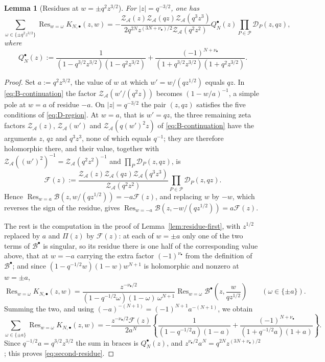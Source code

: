 \documentclass[a4paper,reqno]{amsart}
\numberwithin{equation}{section}
\newtheorem{lemma}[theorem]{Lemma}
\theoremstyle{remark}
\theoremstyle{definition}
\newcommand{\A}{\mathcal{A}}
\begin{document}
\begin{lemma}[Residues at $w=\pm q^2z^{3/2}$]
For $|z|=q^{-3/2}$, one has
\begin{equation}\label{eq:second-residue}
\sum_{\omega\in\{\pm q^2z^{3/2}\}}
\operatorname{Res}_{w=\omega}K_{N,\bullet}(z,w)
=
-\frac{
\mathcal Z_{\A}(z)
\mathcal Z_{\A}(qz)
\mathcal Z_{\A}(q^3z^3)}
{2q^{2N}z^{(3N+\nu_\bullet)/2}\mathcal Z_{\A}(q^2z^2)}
Q_N^{\bullet}(z)
\prod_{P\in\mathcal P}\mathcal D_P(z,qz),
\end{equation}
where
\begin{equation}\label{eq:QN-def}
Q_N^{\bullet}(z)
:=
\frac{1}
{(1-q^{3/2}z^{3/2})(1-q^2z^{3/2})}
+
\frac{(-1)^{N+\nu_\bullet}}
{(1+q^{3/2}z^{3/2})(1+q^2z^{3/2})}.
\end{equation}
\end{lemma}

\begin{proof}
Set $a:=q^2z^{3/2}$, the value of $w$ at which $w'=w/(qz^{1/2})$ equals
$qz$. In \eqref{eq:B-continuation} the factor $\mathcal Z_{\A}(w'/(q^2z))$
becomes $(1-w/a)^{-1}$, a simple pole at $w=a$ of residue $-a$. On
$|z|=q^{-3/2}$ the pair $(z,qz)$ satisfies the five conditions of
\eqref{eq:D-region}. At $w=a$, that is $w'=qz$, the three remaining zeta
factors $\mathcal Z_{\A}(z)$, $\mathcal Z_{\A}(w')$ and
$\mathcal Z_{\A}(q(w')^2z)$ of \eqref{eq:B-continuation} have the arguments
$z$, $qz$ and $q^3z^3$, none of which equals $q^{-1}$; they are therefore
holomorphic there, and their value, together with
$\mathcal Z_{\A}((w')^2)^{-1}=\mathcal Z_{\A}(q^2z^2)^{-1}$ and
$\prod_P\mathcal D_P(z,qz)$, is
$$
\mathscr F(z):=\frac{\mathcal Z_{\A}(z)\mathcal Z_{\A}(qz)
\mathcal Z_{\A}(q^3z^3)}{\mathcal Z_{\A}(q^2z^2)}
\prod_{P\in\mathcal P}\mathcal D_P(z,qz).
$$
Hence $\operatorname{Res}_{w=a}\mathcal B(z,w/(qz^{1/2}))=-a\mathscr F(z)$,
and replacing $w$ by $-w$, which reverses the sign of the residue, gives
$\operatorname{Res}_{w=-a}\mathcal B(z,-w/(qz^{1/2}))=a\mathscr F(z)$.

The rest is the computation in the proof of Lemma~\ref{lem:residue-first},
with $z^{1/2}$ replaced by $a$ and $\Pi(z)$ by $\mathscr F(z)$: at each of
$w=\pm a$ only one of the two terms of $\mathcal B^{\bullet}$ is singular,
so its residue there is one half of the corresponding value above, that at
$w=-a$ carrying the extra factor $(-1)^{\nu_\bullet}$ from the definition of
$\mathcal B^{\bullet}$; and since $(1-q^{-1/2}w)(1-w)w^{N+1}$ is holomorphic
and nonzero at $w=\pm a$,
$$
\operatorname{Res}_{w=\omega}K_{N,\bullet}(z,w)
=
\frac{z^{-\nu_\bullet/2}}
{(1-q^{-1/2}\omega)(1-\omega)\,\omega^{N+1}}
\operatorname{Res}_{w=\omega}
\mathcal B^{\bullet}\!\left(z,\frac{w}{qz^{1/2}}\right)
\qquad(\omega\in\{\pm a\}).
$$
Summing the two, and using $(-a)^{-(N+1)}=(-1)^{N+1}a^{-(N+1)}$, we obtain
$$
\sum_{\omega\in\{\pm a\}}\operatorname{Res}_{w=\omega}K_{N,\bullet}(z,w)
=-\frac{z^{-\nu_\bullet/2}\mathscr F(z)}{2a^N}
\left\{\frac{1}{(1-q^{-1/2}a)(1-a)}
+\frac{(-1)^{N+\nu_\bullet}}{(1+q^{-1/2}a)(1+a)}\right\}.
$$
Since $q^{-1/2}a=q^{3/2}z^{3/2}$ the sum in braces is $Q_N^{\bullet}(z)$, and
$z^{\nu_\bullet/2}a^N=q^{2N}z^{(3N+\nu_\bullet)/2}$; this proves
\eqref{eq:second-residue}.
\end{proof}
\end{document}
